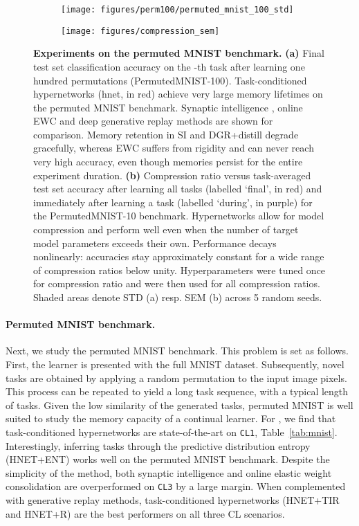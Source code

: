 \documentclass{article}
\begin{document}
\begin{figure}
    \centering
    \begin{subfigure}{0.49\linewidth}
    \caption{}
    \texttt{[image: figures/perm100/permuted\_mnist\_100\_std]}
    \end{subfigure}
    \begin{subfigure}{0.49\linewidth}
    \caption{}
    \texttt{[image: figures/compression\_sem]}
    \end{subfigure}
    \caption{\textbf{Experiments on the permuted MNIST benchmark.} \textbf{(a)} Final test set classification accuracy on the -th task after learning one hundred permutations (PermutedMNIST-100). Task-conditioned hypernetworks (hnet, in red) achieve very large memory lifetimes on the permuted MNIST benchmark. Synaptic intelligence \citep[SI, in blue;][]{zenke_continual_2017}, online EWC \citep[in orange;][]{schwarz_progress_2018} and deep generative replay \citep[DGR+distill, in green;][]{shin_continual_2017} methods are shown for comparison. Memory retention in SI and DGR+distill degrade gracefully,
whereas EWC suffers from rigidity and can never reach very high accuracy, even though memories persist for the entire experiment duration. \textbf{(b)} Compression ratio  versus task-averaged test set accuracy after learning all tasks (labelled `final', in red) and immediately after learning a task (labelled `during', in purple) for the PermutedMNIST-10 benchmark. Hypernetworks allow for model compression and perform well even when the number of target model parameters exceeds their own. Performance decays nonlinearly: accuracies stay approximately constant for a wide range of compression ratios below unity. Hyperparameters were tuned once for compression ratio  and were then used for all compression ratios. Shaded areas denote STD (a) resp. SEM (b) across 5 random seeds.\label{fig:permutedMNIST}}
\end{figure}

\vspace{-2mm}
\paragraph{Permuted MNIST benchmark.} Next, we study the permuted MNIST benchmark. This problem is set as follows. First, the learner is presented with the full MNIST dataset. Subsequently, novel tasks are obtained by applying a random permutation to the input image pixels. This process can be repeated to yield a long task sequence, with a typical length of  tasks. Given the low similarity of the generated tasks, permuted MNIST is well suited to study the memory capacity of a continual learner. For , we find that task-conditioned hypernetworks are state-of-the-art on \texttt{CL1}, Table~\ref{tab:mnist}. Interestingly, inferring tasks through the predictive distribution entropy (HNET+ENT) works well on the permuted MNIST benchmark. Despite the simplicity of the method, both synaptic intelligence \citep[SI;][]{zenke_continual_2017} and online elastic weight consolidation \citep[EWC;][]{schwarz_progress_2018} are overperformed on \texttt{CL3} by a large margin. When complemented with generative replay methods, task-conditioned hypernetworks (HNET+TIR and HNET+R) are the best performers on all three CL scenarios.
\end{document}
